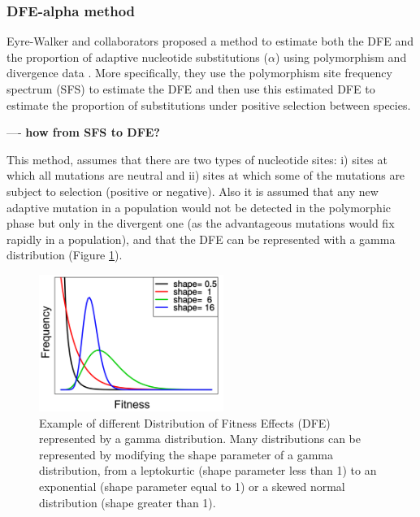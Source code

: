 \subsubsection{DFE-alpha method} \label{alpha}

Eyre-Walker and collaborators proposed a method to estimate both the DFE and the proportion of adaptive nucleotide substitutions ($\alpha$) using polymorphism and divergence data \citep{Eyre-Walker2009}.
More specifically, they use the polymorphism site frequency spectrum (SFS) to estimate the DFE and then use this estimated DFE to estimate the proportion of substitutions under positive selection between species.
	
---- \textbf{how from SFS to DFE?}

This method, assumes that there are two types of nucleotide sites: 
i) sites at which all mutations are neutral and ii) sites at which some of the mutations are subject to selection (positive or negative).
Also it is assumed that any new adaptive mutation in a population would not be detected in the polymorphic phase but only in the divergent one (as the advantageous mutations would fix rapidly in a population), and that the DFE can be represented with a gamma distribution (Figure \ref{fig:Gamma}).

\begin{figure}[h]
  \includegraphics[width=6cm]{./Images/Gamma_dist_2.png}
  \centering
  \caption{Example of different Distribution of Fitness Effects (DFE) represented by a gamma distribution. Many distributions can be represented by modifying the shape parameter of a gamma distribution, from a leptokurtic (shape parameter less than 1) to an exponential (shape parameter equal to 1) or a skewed normal distribution (shape  greater than 1).
   }
  \label{fig:Gamma}
\end{figure}

